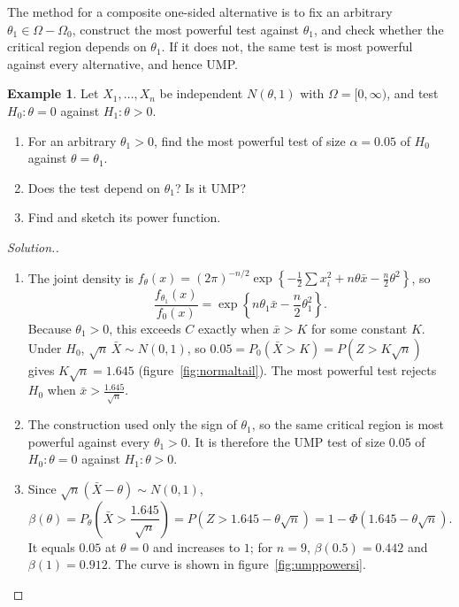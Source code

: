 \documentclass[12pt,a4paper]{report}
\theoremstyle{definition}
\newtheorem{exa}[thm]{Example}
\newenvironment{solution}
  {\renewcommand{\qedsymbol}{}\begin{proof}[\textit{Solution}.]}
  {\end{proof}}
\begin{document}
The method for a composite one-sided alternative is to fix an arbitrary
$\theta_1\in\Omega - \Omega_0$, construct the most powerful test against $\theta_1$, and
check whether the critical region depends on $\theta_1$. If it does not, the same test
is most powerful against every alternative, and hence UMP.

\begin{exa}
\label{ex:umpnormalsi}
Let $X_1, \dots, X_n$ be independent $N(\theta, 1)$ with $\Omega = [0, \infty)$, and test
$H_0\colon\theta = 0$ against $H_1\colon\theta>0$.
\begin{enumerate}
\item[(a)] For an arbitrary $\theta_1>0$, find the most powerful test of size
$\alpha = 0.05$ of $H_0$ against $\theta = \theta_1$.
\item[(b)] Does the test depend on $\theta_1$? Is it UMP?
\item[(c)] Find and sketch its power function.
\end{enumerate}
\end{exa}

\begin{solution}
\begin{enumerate}
\item[(a)] The joint density is
$f_\theta(x) = (2\pi)^{-n/2}\exp\left\{-\frac12\sum x_i^2 + n\theta\bar x - \frac n2\theta^2\right\}$, so
\[\frac{f_{\theta_1}(x)}{f_0(x)} = \exp\left\{n\theta_1\bar x - \frac n2\theta_1^2\right\}.\]
Because $\theta_1>0$, this exceeds $C$ exactly when $\bar x>K$ for some constant $K$.
Under $H_0$, $\sqrt n\,\bar X\sim N(0, 1)$, so
$0.05 = P_0(\bar X>K) = P(Z>K\sqrt n)$ gives $K\sqrt n = 1.645$
(figure~\ref{fig:normaltail}). The most powerful test rejects $H_0$ when
$\bar x>\frac{1.645}{\sqrt n}$.
\item[(b)] The construction used only the sign of $\theta_1$, so the same critical region
is most powerful against every $\theta_1>0$. It is therefore the UMP test of size
$0.05$ of $H_0\colon\theta = 0$ against $H_1\colon\theta>0$.
\item[(c)] Since $\sqrt n(\bar X - \theta)\sim N(0, 1)$,
\[\beta(\theta) = P_\theta\left(\bar X>\frac{1.645}{\sqrt n}\right) = P\left(Z>1.645 - \theta\sqrt n\right) = 1 - \Phi\left(1.645 - \theta\sqrt n\right).\]
It equals $0.05$ at $\theta = 0$ and increases to $1$; for $n = 9$, $\beta(0.5) = 0.442$ and
$\beta(1) = 0.912$. The curve is shown in figure~\ref{fig:umppowersi}.
\end{enumerate}
\end{solution}
\end{document}
